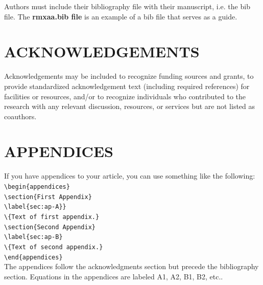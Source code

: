 \documentclass[9pt,twoside]{rmaa-rho-class/rmaa-rho_light}
\newcommand{\CS}[1]{\texttt{\textbackslash #1}}
\begin{document}
    Authors must include their bibliography file with their manuscript, i.e. the 
    bib file. The {\bf rmxaa.bib file} is an example of a bib file that serves as a guide.

\renewcommand{\refname}{REFERENCES}




\section{ACKNOWLEDGEMENTS}

Acknowledgements may be included to recognize funding sources and grants, to provide standardized acknowledgement text (including required references) for facilities or resources, and/or to recognize individuals who contributed to the research with any relevant discussion, resources, or services but are not listed as coauthors.



\section{APPENDICES}

If you have appendices to your article, you can use something like the following:\\
    
    \noindent\CS{begin}\verb|{appendices}|\\
    \CS{section}\verb|{First Appendix}|\\
    \CS{label}\verb|{sec:ap-A}}|\\
    \CS{}\verb|{Text of first appendix.}|\\
    \CS{section}\verb|{Second Appendix}|\\
    \CS{label}\verb|{sec:ap-B}|\\
    \CS{}\verb|{Text of second appendix.}|\\
    \CS{end}\verb|{appendices}|\\

The appendices follow the acknowledgments section but precede the bibliography section. Equations in the appendices are labeled A1, A2, B1, B2, etc..
\end{document}
